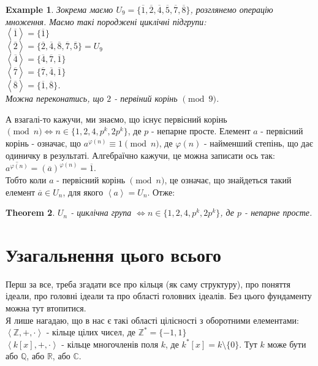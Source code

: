 \documentclass[a4paper, 14pt]{extarticle}
\theoremstyle{theoremdd}
\newtheorem{theorem}{Theorem}[subsection]
\theoremstyle{theoremdd}
\theoremstyle{theoremdd}
\theoremstyle{theoremdd}
\newtheorem{example}[theorem]{Example}
\theoremstyle{theoremdd}
\theoremstyle{theoremdd}
\theoremstyle{theoremdd}
\theoremstyle{theoremdd}
\begin{document}
\begin{example}
Зокрема маємо $U_9 = \{ \overline{1}, \overline{2}, \overline{4}, \overline{5}, \overline{7}, \overline{8} \}$, розглянемо операцію множення. Маємо такі породжені циклічні підгрупи:\\
$\left< \overline{1} \right> = \{ \overline{1} \}$\\
$\left< \overline{2} \right> = \{ \overline{2}, \overline{4}, \overline{8}, \overline{7}, \overline{5} \} = U_9$\\
$\left< \overline{4} \right> = \{ \overline{4}, \overline{7}, \overline{1} \}$\\
$\left< \overline{7} \right> = \{ \overline{7},\overline{4},\overline{1} \}$\\
$\left< \overline{8} \right> = \{ \overline{1}, \overline{8} \}$.\\
Можна переконатись, що $2$ - первіний корінь $\pmod 9$.
\end{example}

А взагалі-то кажучи, ми знаємо, що існує первісний корінь $\pmod n \iff n \in \{1,2,4,p^k,2p^k\}$, де $p$ - непарне просте. Елемент $a$ - первісний корінь -  означає, що $a^{\varphi(n)} \equiv 1 \pmod n$, де $\varphi(n)$ - найменший степінь, що дає одиничку в результаті. Алгебраїчно кажучи, це можна записати ось так:\\
$\overline{a^{\varphi(n)}} = (\overline{a})^{\varphi(n)} = \overline{1}$.\\
Тобто коли $a$ - первісний корінь $\pmod n$, це означає, що знайдеться такий елемент $\overline{a} \in U_n$, для якого $\left< a \right> = U_n$. Отже:

\begin{theorem}
$U_n$ - циклічна група $\iff n \in \{1,2,4,p^k,2p^k\}$, де $p$ - непарне просте.
\end{theorem}
\fi

\newpage
\section{Узагальнення цього всього}
Перш за все, треба згадати все про кільця (як саму структуру), про поняття ідеали, про головні ідеали та про області головних ідеалів. Без цього фундаменту можна тут втопитися.
\bigskip \\
Я лише нагадаю, що в нас є такі області цілісності з оборотними елементами:\\
$\left< \mathbb{Z}, +, \cdot \right>$ - кільце цілих чисел, де $\mathbb{Z}^* = \{-1,1\}$\\
$\left< k[x], +, \cdot \right>$ - кільце многочленів поля $k$, де $k^*[x] = k \setminus \{0\}$. Тут $k$ може бути або $\mathbb{Q}$, або $\mathbb{R}$, або $\mathbb{C}$.
\end{document}
